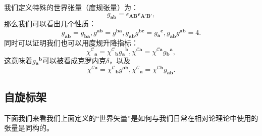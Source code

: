 我们定义特殊的世界张量（度规张量）为：
\begin{equation}
	g_{\boldsymbol{ab}} =\epsilon _{\boldsymbol{AB}} \epsilon _{\boldsymbol{A} '\boldsymbol{B} '} ,
	\label{eq:4.1}
\end{equation}
那么我们可以看出几个性质：
\begin{equation*}
	g_{\boldsymbol{ab}} =g_{\boldsymbol{ba}} ,g^{\boldsymbol{ab}} =g^{\boldsymbol{ba}} ,g_{\boldsymbol{ab}} g^{\boldsymbol{bc}} =g{_{\boldsymbol{a}}}^{\boldsymbol{c}} ,g_{\boldsymbol{ab}} g^{\boldsymbol{ab}} =4.
\end{equation*}
同时可以证明我们也可以用度规升降指标：
\begin{equation*}
	\chi ^{\mathcal{C}}{}_{\boldsymbol{a}} =\chi ^{\mathcal{C}}{}_{\boldsymbol{b}} g{_{\boldsymbol{a}}}^{\boldsymbol{b}} ,\chi ^{\mathcal{C}\boldsymbol{a}} =\chi ^{\mathcal{C}\boldsymbol{a}} g{_{\boldsymbol{b}}}^{\boldsymbol{a}} ,
\end{equation*}
这意味着$g{_{\boldsymbol{a}}}^{\boldsymbol{b}}$可以被看成克罗内克$\delta $，以及
\begin{equation*}
	\chi ^{\mathcal{C}\boldsymbol{a}} =\chi ^{\mathcal{C}}{}_{\boldsymbol{b}} g^{\boldsymbol{ab}} ,\chi ^{\mathcal{C}}{}_{\boldsymbol{a}} =\chi ^{\mathcal{C}\boldsymbol{b}} g_{\boldsymbol{ab}} .
\end{equation*}
\subsection{自旋标架}

下面我们来看我们上面定义的“世界矢量”是如何与我们日常在相对论理论中使用的张量是同构的。



